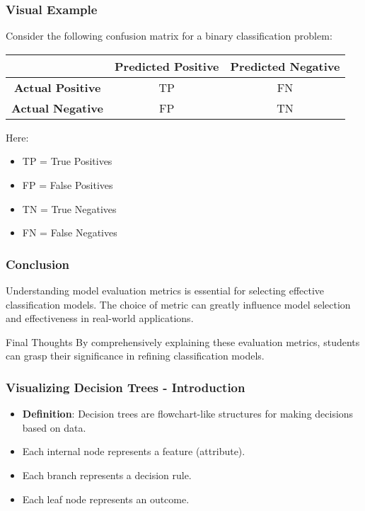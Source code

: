 \documentclass[aspectratio=169]{beamer}
\begin{document}
\begin{frame}[fragile]
    \frametitle{Visual Example}
    Consider the following confusion matrix for a binary classification problem:
    
    \begin{center}
    \begin{tabular}{|c|c|c|}
        \hline
        & \textbf{Predicted Positive} & \textbf{Predicted Negative} \\
        \hline
        \textbf{Actual Positive} & TP & FN \\
        \hline
        \textbf{Actual Negative} & FP & TN \\
        \hline
    \end{tabular}
    \end{center}
    
    Here:
    \begin{itemize}
        \item TP = True Positives
        \item FP = False Positives
        \item TN = True Negatives
        \item FN = False Negatives
    \end{itemize}
\end{frame}

\begin{frame}[fragile]
    \frametitle{Conclusion}
    Understanding model evaluation metrics is essential for selecting effective classification models. The choice of metric can greatly influence model selection and effectiveness in real-world applications.
    
    \begin{block}{Final Thoughts}
        By comprehensively explaining these evaluation metrics, students can grasp their significance in refining classification models.
    \end{block}
\end{frame}

\begin{frame}[fragile]
    \frametitle{Visualizing Decision Trees - Introduction}
    \begin{itemize}
        \item \textbf{Definition}: Decision trees are flowchart-like structures for making decisions based on data.
        \item Each internal node represents a feature (attribute).
        \item Each branch represents a decision rule.
        \item Each leaf node represents an outcome.
    \end{itemize}
\end{frame}
\end{document}
